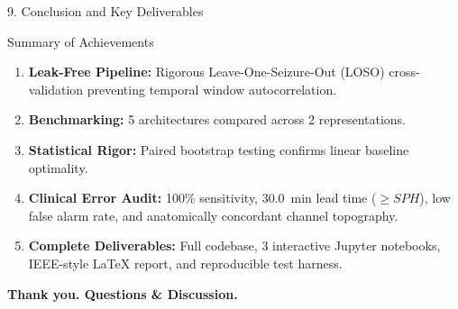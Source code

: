 \documentclass[aspectratio=169,10pt]{beamer}
\begin{document}
\begin{frame}{9. Conclusion and Key Deliverables}
\begin{block}{Summary of Achievements}
\begin{enumerate}
    \item \textbf{Leak-Free Pipeline:} Rigorous Leave-One-Seizure-Out (LOSO) cross-validation preventing temporal window autocorrelation.
    \item \textbf{Benchmarking:} 5 architectures compared across 2 representations.
    \item \textbf{Statistical Rigor:} Paired bootstrap testing confirms linear baseline optimality.
    \item \textbf{Clinical Error Audit:} 100\% sensitivity, 30.0~min lead time ($\ge SPH$), low false alarm rate, and anatomically concordant channel topography.
    \item \textbf{Complete Deliverables:} Full codebase, 3 interactive Jupyter notebooks, IEEE-style LaTeX report, and reproducible test harness.
\end{enumerate}
\end{block}

\vspace{0.3cm}
\centering
\textbf{Thank you. Questions \& Discussion.}
\end{frame}
\end{document}
